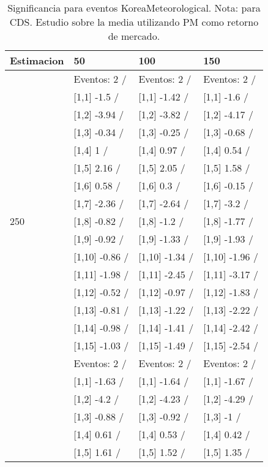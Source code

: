 \begin{table}

\caption{Significancia para eventos KoreaMeteorological. Nota: para CDS. Estudio sobre la media utilizando PM como retorno de mercado.}
\centering
\begin{tabular}[t]{llll}
\toprule
Estimacion & 50 & 100 & 150\\
\midrule
 & Eventos:  2 / & Eventos:  2 / & Eventos:  2 /\\
 & {}[1,1] -1.5  / & {}[1,1] -1.42  / & {}[1,1] -1.6  /\\
 & {}[1,2] -3.94  / & {}[1,2] -3.82  / & {}[1,2] -4.17  /\\
 & {}[1,3] -0.34  / & {}[1,3] -0.25  / & {}[1,3] -0.68  /\\
 & {}[1,4] 1  / & {}[1,4] 0.97  / & {}[1,4] 0.54  /\\
\addlinespace
 & {}[1,5] 2.16  / & {}[1,5] 2.05  / & {}[1,5] 1.58  /\\
 & {}[1,6] 0.58  / & {}[1,6] 0.3  / & {}[1,6] -0.15  /\\
 & {}[1,7] -2.36  / & {}[1,7] -2.64  / & {}[1,7] -3.2  /\\
250 & {}[1,8] -0.82  / & {}[1,8] -1.2  / & {}[1,8] -1.77  /\\
 & {}[1,9] -0.92  / & {}[1,9] -1.33  / & {}[1,9] -1.93  /\\
\addlinespace
 & {}[1,10] -0.86  / & {}[1,10] -1.34  / & {}[1,10] -1.96  /\\
 & {}[1,11] -1.98  / & {}[1,11] -2.45  / & {}[1,11] -3.17  /\\
 & {}[1,12] -0.52  / & {}[1,12] -0.97  / & {}[1,12] -1.83  /\\
 & {}[1,13] -0.81  / & {}[1,13] -1.22  / & {}[1,13] -2.22  /\\
 & {}[1,14] -0.98  / & {}[1,14] -1.41  / & {}[1,14] -2.42  /\\
\addlinespace
 & {}[1,15] -1.03  / & {}[1,15] -1.49  / & {}[1,15] -2.54  /\\
 & Eventos:  2 / & Eventos:  2 / & Eventos:  2 /\\
 & {}[1,1] -1.63  / & {}[1,1] -1.64  / & {}[1,1] -1.67  /\\
 & {}[1,2] -4.2  / & {}[1,2] -4.23  / & {}[1,2] -4.29  /\\
 & {}[1,3] -0.88  / & {}[1,3] -0.92  / & {}[1,3] -1  /\\
\addlinespace
 & {}[1,4] 0.61  / & {}[1,4] 0.53  / & {}[1,4] 0.42  /\\
 & {}[1,5] 1.61  / & {}[1,5] 1.52  / & {}[1,5] 1.35  /\\

\end{tabular}
\end{table}
